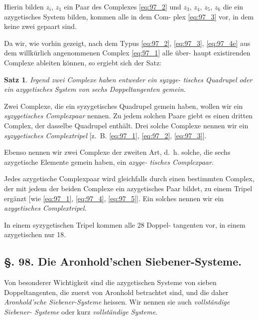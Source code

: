 \documentclass[12pt,a4paper]{article}
\theoremstyle{plain}
\newtheorem{satz}{Satz}[section]
\theoremstyle{definition}
\theoremstyle{remark}
\begin{document}
Hierin bilden $z_i$, $z_1$ ein Paar des Complexes \eqref{eq:97_2} und $z_3$, $z_4$, $z_5$, $z_6$
die ein azygetisches System bilden, kommen alle in dem Com-
plex \eqref{eq:97_3} vor, in dem keine zwei gepaart sind.

Da wir, wie vorhin gezeigt, nach dem Typus \eqref{eq:97_2}, \eqref{eq:97_3}, \eqref{eq:97_4e}
aus dem willkürlich angenommenen Complex \eqref{eq:97_1} alle über-
haupt existirenden Complexe ableiten können, so ergiebt sich
der Satz:

\begin{satz}
Irgend zwei Complexe haben entweder ein syzyge-
tisches Quadrupel oder ein azygetisches System
von sechs Doppeltangenten gemein.
\end{satz}

Zwei Complexe, die ein syzygetisches Quadrupel gemein
haben, wollen wir ein \emph{syzygetisches Complexpaar} nennen.
Zu jedem solchen Paare giebt es einen dritten Complex, der
dasselbe Quadrupel enthält. Drei solche Complexe nennen wir
ein \emph{syzygetisches Complextripel} [z.~B. \eqref{eq:97_1}, \eqref{eq:97_2}, \eqref{eq:97_3}].

Ebenso nennen wir zwei Complexe der zweiten Art, d.~h.
solche, die sechs azygetische Elemente gemein haben, ein \emph{azyge-
tisches Complexpaar}.

Jedes azygetische Complexpaar wird gleichfalls durch einen
bestimmten Complex, der mit jedem der beiden Complexe ein
azygetisches Paar bildet, zu einem Tripel ergänzt [wie \eqref{eq:97_1}, \eqref{eq:97_4}, \eqref{eq:97_5}].
Ein solches nennen wir ein \emph{azygetisches Complextripel}.

In einem syzygetischen Tripel kommen alle 28 Doppel-
tangenten vor, in einem azygetischen nur 18.

\subsection*{§. 98. Die Aronhold'schen Siebener-Systeme.}

Von besonderer Wichtigkeit sind die azygetischen Systeme
von sieben Doppeltangenten, die zuerst von Aronhold betrachtet
sind, und die daher \emph{Aronhold'sche Siebener-Systeme}
heissen. Wir nennen sie auch \emph{vollständige Siebener-
Systeme} oder kurz \emph{vollständige Systeme}.
\end{document}
